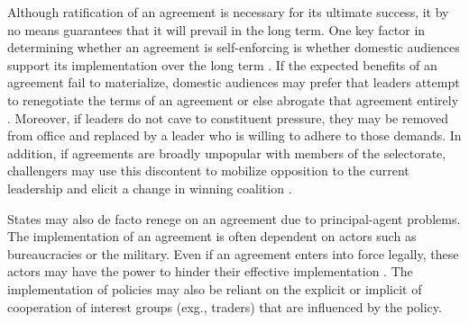 Although ratification of an agreement is necessary for its ultimate success, it by no means guarantees that it will prevail in the long term. One key factor in determining whether an agreement is self-enforcing is whether domestic audiences support its implementation over the long term \citep{fearon1998}. If the expected benefits of an agreement fail to materialize, domestic audiences may prefer that leaders attempt to renegotiate the terms of an agreement or else abrogate that agreement entirely \citep{fearon1998, putnam1988}. Moreover, if leaders do not cave to constituent pressure, they may be removed from office and replaced by a leader who is willing to adhere to those demands. In addition, if agreements are broadly unpopular with members of the selectorate, challengers may use this discontent to mobilize opposition to the current leadership and elicit a change in winning coalition \citep[e.g., ][]{colaresi2005, fearon1998, vasquez2009}.






























States may also de facto renege on an agreement due to principal-agent problems. The implementation of an agreement is often dependent on actors such as bureaucracies or the military. Even if an agreement enters into force legally, these actors may have the power to hinder their effective implementation \citep{putnam1988}. The implementation of policies may also be reliant on the explicit or implicit of cooperation of interest groups (exg., traders) that are influenced by the policy.















